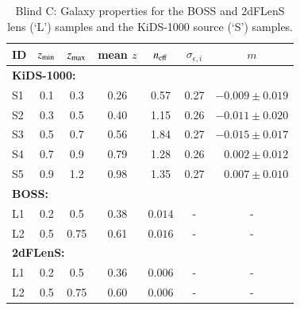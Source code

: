 \begin{appendix}
\begin{table}
\caption{Blind C: Galaxy properties for the BOSS and 2dFLenS lens (\lq L\rq) samples and the KiDS-1000 source (\lq S\rq) samples.}              %
\label{tab:datatab_BlindC}      %
\centering                                      %
\begin{tabular}{lcccccr}          %
\hline\hline                        %
ID & $z_{\rm min}$ &  $z_{\rm max}$& mean $z$ & $n_{\rm eff}$ & $\sigma_{\epsilon,i}$ & \multicolumn{1}{c}{$m$}\\    %
\hline
\multicolumn{6}{l}{\bf KiDS-1000:}\\  
S1 & 0.1 & 0.3 & 0.26 & 0.57 &  0.27 & $-0.009\pm0.019$\\
S2 & 0.3 & 0.5 & 0.40 & 1.15 &  0.26 & $-0.011\pm0.020$\\
S3 & 0.5 & 0.7 & 0.56 & 1.84 &  0.27 & $-0.015\pm0.017$\\
S4 & 0.7 & 0.9 & 0.79 & 1.28 &  0.26 & $0.002\pm0.012$\\
S5 & 0.9 & 1.2 & 0.98 & 1.35 &  0.27 & $0.007\pm0.010$\\
\hline      
\multicolumn{6}{l}{\bf BOSS:}\\                             %
L1 & 0.2 & 0.5 & 0.38 & $0.014$ & -  & \multicolumn{1}{c}{-}\\
L2 & 0.5 & 0.75 & 0.61 & $0.016$ & -  & \multicolumn{1}{c}{-}\\
\hline      
\multicolumn{6}{l}{\bf 2dFLenS:}\\                                %
L1 & 0.2 & 0.5 & 0.36 & $0.006$ & - & \multicolumn{1}{c}{-}\\
L2 & 0.5 & 0.75 & 0.60 & $0.006$ & - & \multicolumn{1}{c}{-}\\
\hline
\end{tabular}
\end{table}





\end{appendix}
